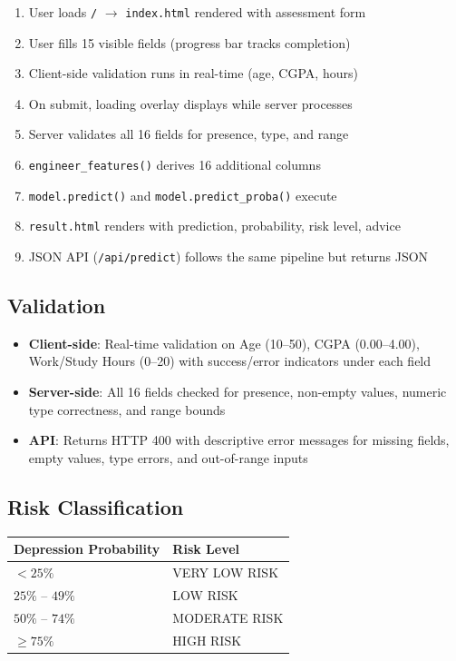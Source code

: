 \documentclass[11pt,a4paper]{article}
\begin{document}
\begin{enumerate}[nosep]
    \item User loads \texttt{/} $\rightarrow$ \texttt{index.html} rendered with assessment form
    \item User fills 15 visible fields (progress bar tracks completion)
    \item Client-side validation runs in real-time (age, CGPA, hours)
    \item On submit, loading overlay displays while server processes
    \item Server validates all 16 fields for presence, type, and range
    \item \texttt{engineer\_features()} derives 16 additional columns
    \item \texttt{model.predict()} and \texttt{model.predict\_proba()} execute
    \item \texttt{result.html} renders with prediction, probability, risk level, advice
    \item JSON API (\texttt{/api/predict}) follows the same pipeline but returns JSON
\end{enumerate}

\subsection{Validation}

\begin{itemize}[nosep]
    \item \textbf{Client-side}: Real-time validation on Age (10--50), CGPA (0.00--4.00), Work/Study Hours (0--20) with success/error indicators under each field
    \item \textbf{Server-side}: All 16 fields checked for presence, non-empty values, numeric type correctness, and range bounds
    \item \textbf{API}: Returns HTTP 400 with descriptive error messages for missing fields, empty values, type errors, and out-of-range inputs
\end{itemize}

\subsection{Risk Classification}

\begin{tabularx}{\textwidth}{l X}
\hline
\textbf{Depression Probability} & \textbf{Risk Level} \\
\hline
$< 25\%$ & VERY LOW RISK \\
$25\%$ -- $49\%$ & LOW RISK \\
$50\%$ -- $74\%$ & MODERATE RISK \\
$\geq 75\%$ & HIGH RISK \\
\hline
\end{tabularx}
\end{document}
